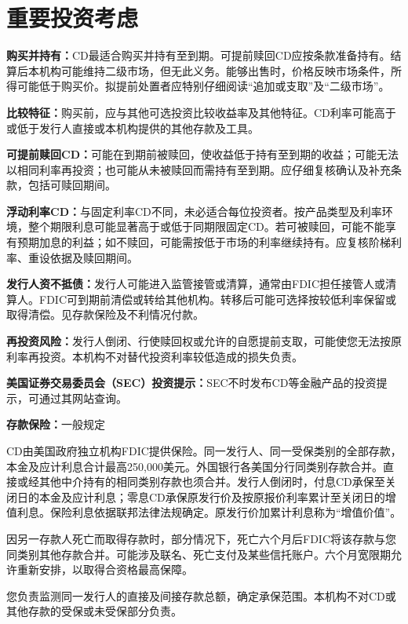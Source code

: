 \documentclass[UTF8,fontset=none,11pt,a4paper]{ctexart}
\begin{document}
\section*{重要投资考虑}
\textbf{购买并持有：}CD最适合购买并持有至到期。可提前赎回CD应按条款准备持有。结算后本机构可能维持二级市场，但无此义务。能够出售时，价格反映市场条件，所得可能低于购买价。拟提前处置者应特别仔细阅读“追加或支取”及“\allowbreak\mbox{二级市场”。}


\textbf{比较特征：}购买前，应与其他可选投资比较收益率及其他特征。CD利率可能高于或低于发行人直接或本机构提供的其他存\allowbreak\mbox{款及工具。}


\textbf{可提前赎回CD：}可能在到期前被赎回，使收益低于持有至到期的收益；可能无法以相同利率再投资；也可能从未被赎回而需持有至到期。应仔细复核确认及补充条款，包括可\allowbreak\mbox{赎回期间。}


\textbf{浮动利率CD：}与固定利率CD不同，未必适合每位投资者。按产品类型及利率环境，整个期限利息可能显著高于或低于同期限固定CD。若可被赎回，可能不能享有预期加息的利益；如不赎回，可能需按低于市场的利率继续持有。应复核阶梯利率、重设依据及\allowbreak\mbox{赎回期间。}


\textbf{发行人资不抵债：}发行人可能进入监管接管或清算，通常由FDIC担任接管人或清算人。FDIC可到期前清偿或转给其他机构。转移后可能可选择按较低利率保留或取得清偿。见存款保险及不利\allowbreak\mbox{情况付款。}


\textbf{再投资风险：}发行人倒闭、行使赎回权或允许的自愿提前支取，可能使您无法按原利率再投资。本机构不对替代投资利率较低造成的\allowbreak\mbox{损失负责。}


\textbf{美国证券交易委员会（SEC）投资提示：}SEC不时发布CD等金融产品的投资提示，可通过其网\allowbreak\mbox{站查询。}


\textbf{存款保险：}\allowbreak\mbox{一般规定}


CD由美国政府独立机构FDIC提供保险。同一发行人、同一受保类别的全部存款，本金及应计利息合计最高250,000美元。外国银行各美国分行同类别存款合并。直接或经其他中介持有的相同类别存款也须合并。发行人倒闭时，付息CD承保至关闭日的本金及应计利息；零息CD承保原发行价及按原报价利率累计至关闭日的增值利息。保险利息依据联邦法律法规确定。原发行价加累计利息称为“\allowbreak\mbox{增值价值”。}


因另一存款人死亡而取得存款时，部分情况下，死亡六个月后FDIC将该存款与您同类别其他存款合并。可能涉及联名、死亡支付及某些信托账户。六个月宽限期允许重新安排，以取得合资格\allowbreak\mbox{最高保障。}


您负责监测同一发行人的直接及间接存款总额，确定承保范围。本机构不对CD或其他存款的受保或未受保\allowbreak\mbox{部分负责。}
\end{document}
